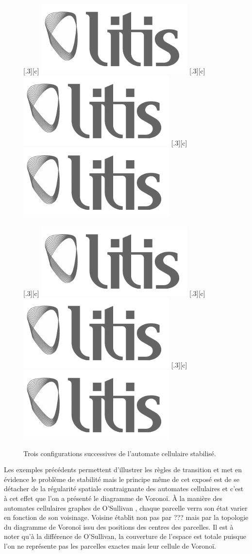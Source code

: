 \documentclass[12pt]{article}
\begin{document}
\begin{figure}[h]
  \centering
  \subcaptionbox{}[.3\linewidth][c]{
    \includegraphics[width=.3\linewidth]{images/logo-litis.png}
  }
  \subcaptionbox{}[.3\linewidth][c]{
    \includegraphics[width=.3\linewidth]{images/logo-litis.png}
  }
  \subcaptionbox{}[.3\linewidth][c]{
    \includegraphics[width=.3\linewidth]{images/logo-litis.png}
  }

  \subcaptionbox{}[.3\linewidth][c]{
    \includegraphics[width=.3\linewidth]{images/logo-litis.png}
  }
  \subcaptionbox{}[.3\linewidth][c]{
    \includegraphics[width=.3\linewidth]{images/logo-litis.png}
  }
  \subcaptionbox{}[.3\linewidth][c]{
    \includegraphics[width=.3\linewidth]{images/logo-litis.png}
  }
  \caption{Trois configurations successives de l'automate cellulaire
    stabilisé.}
  \label{fig:ac-stable}
\end{figure}

Les exemples précédents permettent d'illustrer les règles de
transition et met en évidence le problème de stabilité mais le
principe même de cet exposé est de se détacher de la régularité
spatiale contraignante des automates cellulaires et c'est à cet effet
que l'on a présenté le diagramme de Voronoï. À la manière des
automates cellulaires graphes de O'Sullivan \cite{O'Sullivan2000},
chaque parcelle verra son état varier en fonction de son
voisinage. Voisine établit non pas par ??? mais par la topologie du
diagramme de Voronoï issu des positions des centres des parcelles. Il
est à noter qu'à la différence de O'Sullivan, la couverture de
l'espace est totale puisque l'on ne représente pas les parcelles
exactes mais leur cellule de Voronoï.
\end{document}
